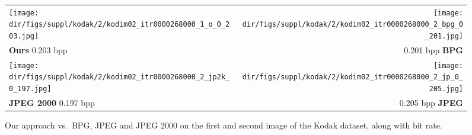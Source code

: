 \begin{subappendices}
\begin{figure*}[!h]
\begin{tabular}{lr}
\texttt{[image: \\dir/figs/suppl/kodak/2/kodim02\_itr0000268000\_1\_o\_0\_203.jpg]}&
\texttt{[image: \\dir/figs/suppl/kodak/2/kodim02\_itr0000268000\_2\_bpg\_0\_201.jpg]}\\[-0.5ex]
\textbf{Ours} 0.203 bpp & 0.201 bpp \textbf{BPG} \\
\texttt{[image: \\dir/figs/suppl/kodak/2/kodim02\_itr0000268000\_2\_jp2k\_0\_197.jpg]}&
\texttt{[image: \\dir/figs/suppl/kodak/2/kodim02\_itr0000268000\_2\_jp\_0\_205.jpg]}\\
\textbf{JPEG 2000} 0.197 bpp & 0.205 bpp \textbf{JPEG}

\end{tabular}
\caption{\label{imgc:fig:vis_ex_Kodak_first}Our approach vs.\ BPG, JPEG and JPEG 2000 on the first and second image of the Kodak dataset, along with bit rate.}
\end{figure*}



\end{subappendices}
